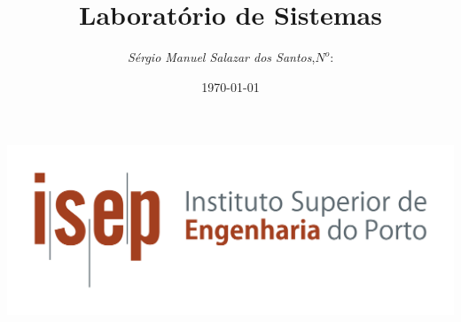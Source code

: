 \begin{titlepage}
\begin{minipage}{0.95\linewidth}
\centering
\includegraphics[scale=0.60]{./image/Capa/ISEP_marca_cor_grande.png}
\label{Capa}
\title{Laborat\'{o}rio de Sistemas}
\author{\emph{S\'{e}rgio Manuel Salazar dos Santos},\;$N^o$:}
\date{\today}
\maketitle
\end{minipage}
\end{titlepage}
